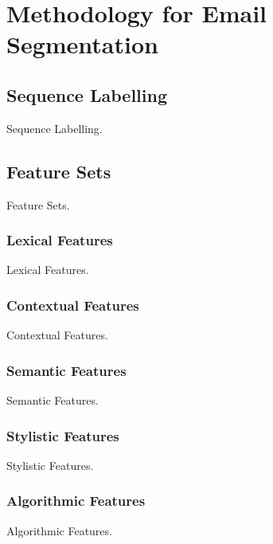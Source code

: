 
\chapter{Methodology for Email Segmentation}

\section{Sequence Labelling}

Sequence Labelling.

\section{Feature Sets}

Feature Sets.

\subsection{Lexical Features}

Lexical Features.

\subsection{Contextual Features}

Contextual Features.

\subsection{Semantic Features}

Semantic Features.

\subsection{Stylistic Features}

Stylistic Features.

\subsection{Algorithmic Features}

Algorithmic Features.